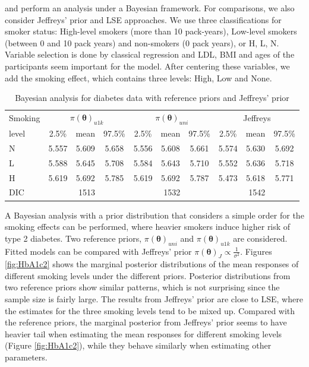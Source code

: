 \documentclass[Proceedings]{ascelike}
\begin{document}
and perform an analysis under a Bayesian framework. For comparisons,
we also consider Jeffreys' prior and LSE approaches. We use three
classifications for smoker status: High-level smokers (more than 10
pack-years), Low-level smokers (between 0 and 10 pack years) and
non-smokers (0 pack years), or H, L, N. Variable selection is done by
classical regression and LDL, BMI and ages of the participants seem
important for the model. After centering these variables, we add the
smoking effect, which contains three levels: High, Low and None.\\
\begin{table}[h!]
  \centering
  \caption{Bayesian analysis for diabetes data with reference priors and Jeffreys' prior}
\begin{tabular}{|l|c|c|c|c|c|c|c|c|c|}
    \hline
Smoking & \multicolumn{3}{|c|}{$\pi(\pmb\theta)_{u1k}$} &\multicolumn{3}{|c|}{$\pi(\pmb\theta)_{uni}$}&\multicolumn{3}{|c|}{Jeffreys}\\
\cline{2-10}
level & 2.5\% & mean & 97.5\% & 2.5\% & mean & 97.5\% & 2.5\% & mean & 97.5\%  \\
\hline
N & 5.557 & 5.609 &  5.658 & 5.556 & 5.608 &  5.661 & 5.574 & 5.630 & 5.692 \\
L & 5.588 & 5.645 & 5.708 & 5.584 & 5.643 & 5.710 & 5.552 & 5.636 &  5.718  \\
H & 5.619 & 5.692 & 5.785 & 5.619 & 5.692 & 5.787 & 5.473 & 5.618 & 5.771  \\
\hline
DIC& \multicolumn{3}{|c|}{1513} &\multicolumn{3}{|c|}{1532}&\multicolumn{3}{|c|}{1542}\\
\hline
\end{tabular}
\label{tab:mcmc}
\end{table}

A Bayesian analysis with a prior distribution that considers a simple
order for the smoking effects can be performed, where heavier smokers
induce higher risk of type 2 diabetes. Two reference priors,
$\pi(\pmb\theta)_{uni}$ and $\pi(\pmb\theta)_{u1k}$ are
considered. Fitted models can be compared with Jeffreys' prior
$\pi(\pmb\theta)_{J}\propto \frac{1}{\sigma^2}$. Figures
\ref{fig:HbA1c2} shows the marginal posterior distributions of the
mean responses of different smoking levels under the different
priors. Posterior distributions from two reference priors show similar
patterns, which is not surprising since the sample size is fairly
large. The results from Jeffreys' prior are close to LSE, where the
estimates for the three smoking levels tend to be mixed up. Compared
with the reference priors, the marginal posterior from Jeffreys' prior
seems to have heavier tail when estimating the mean responses for
different smoking levels (Figure \ref{fig:HbA1c2}), while they behave
similarly when estimating other parameters.
\end{document}
